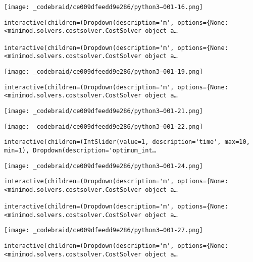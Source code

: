 \documentclass[
]{article}
\begin{document}
\texttt{[image: \_codebraid/ce009dfeedd9e286/python3--001-16.png]}

\begin{verbatim}
interactive(children=(Dropdown(description='m', options={None: <minimod.solvers.costsolver.CostSolver object a…

interactive(children=(Dropdown(description='m', options={None: <minimod.solvers.costsolver.CostSolver object a…
\end{verbatim}

\texttt{[image: \_codebraid/ce009dfeedd9e286/python3--001-19.png]}

\begin{verbatim}
interactive(children=(Dropdown(description='m', options={None: <minimod.solvers.costsolver.CostSolver object a…
\end{verbatim}

\texttt{[image: \_codebraid/ce009dfeedd9e286/python3--001-21.png]}

\texttt{[image: \_codebraid/ce009dfeedd9e286/python3--001-22.png]}

\begin{verbatim}
interactive(children=(IntSlider(value=1, description='time', max=10, min=1), Dropdown(description='optimum_int…
\end{verbatim}

\texttt{[image: \_codebraid/ce009dfeedd9e286/python3--001-24.png]}

\begin{verbatim}
interactive(children=(Dropdown(description='m', options={None: <minimod.solvers.costsolver.CostSolver object a…

interactive(children=(Dropdown(description='m', options={None: <minimod.solvers.costsolver.CostSolver object a…
\end{verbatim}

\texttt{[image: \_codebraid/ce009dfeedd9e286/python3--001-27.png]}

\begin{verbatim}
interactive(children=(Dropdown(description='m', options={None: <minimod.solvers.costsolver.CostSolver object a…
\end{verbatim}
\end{document}

